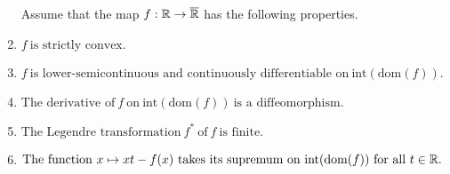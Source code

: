 \begin{assumption}
  \begin{enumerate}[label={(\roman*)}]
    Assume that the map 
    $
      f: \mathbb{R} \to \overline{\mathbb{R}}
    $
    has the following properties.
    \item
      $
        f 
        \ 
        \text{is strictly convex.}
      $
    \item
      $
        f
        \ 
        \text{is lower-semicontinuous and continuously differentiable on}
        \ 
        \mathrm{int}(\mathrm{dom}(f))
        .
      $
    \item
      $
        \text{The derivative of}\ 
        f\ 
        \text{on}\ 
        \mathrm{int}(\mathrm{dom}(f))
        \ 
        \text{is a diffeomorphism.}
      $
    \item
      $
        \text{The Legendre transformation}
        \ 
        f^*
        \ 
        \text{of}\ 
        f
        \ 
        \text{is finite}
        .
      $
    \item
      $
        \text{The function}\
        x\mapsto xt - f(x)
        \ 
        \text{takes its supremum on}
        \ 
        \mathrm{int}(\mathrm{dom}(f))
        \ 
        \text{for all}
        \ 
        t\in \R.
      $
  \end{enumerate}
\end{assumption}

